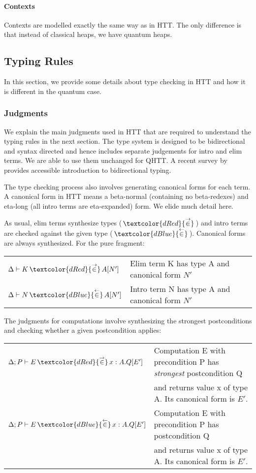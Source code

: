 \documentclass[acmsmall,nonacm,timestamp,review=false,anonymous=false]{acmart}
\newcommand{\chkcolor}{dBlue}
\newcommand{\syncolor}{dRed}
\newcommand{\chk}{\,\textcolor{\chkcolor}{{\stackrel{\leftarrow}{\in}}}\,}
\newcommand{\uncoloredsyn}{{{\stackrel{\rightarrow}{\in}}}}
\newcommand{\syn}{\,\textcolor{\syncolor}{\uncoloredsyn}\,}
\begin{document}
\paragraph{Contexts} Contexts are modelled exactly the same way as in HTT. The only difference is that instead of classical heaps, we have quantum heaps.

\subsection{Typing Rules}
\label{sec:typing}

In this section, we provide some details about type checking in HTT and how it is different in the quantum case.

\subsubsection{Judgments}
We explain the main judgments used in HTT that are required to understand the typing rules in the next section. The type system is designed to be bidirectional and syntax directed and hence includes separate judgements for intro and elim terms. We are able to use them unchanged for QHTT. A recent survey by \citet{dunfield2019bidirectional} provides accessible introduction to bidirectional typing.

The type checking process also involves generating canonical forms for each term. A canonical form in HTT means a beta-normal (containing no beta-redexes) and eta-long (all intro terms are eta-expanded) form. We elide much detail here.

As usual, elim terms synthesize types ($\syn$) and intro terms are checked against the given type ($\chk$). Canonical forms are always synthesized. For the pure fragment:

\begin{center}
	\begin{tabular}{ll}
		$\Delta \vdash K \syn A [N']$ & Elim term K has type A and canonical form $N'$ \\
		$\Delta \vdash N \chk A [N']$ & Intro term N has type A and canonical form $N'$
	\end{tabular}
\end{center}

The judgments for computations involve synthesizing the strongest postconditions and checking whether a given postcondition applies:

\begin{center}
	\begin{tabular}{ll}
		$\Delta; P \vdash E \syn x:A.Q[E']$ & Computation E with precondition P has \textit{strongest} postcondition Q\\ & and returns value x of type A. Its canonical form is $E'$. \\
		$\Delta; P \vdash E \chk x:A.Q[E']$ & Computation E with precondition P has postcondition Q\\ & and returns value x of type A. Its canonical form is $E'$.
	\end{tabular}
\end{center}
\end{document}
